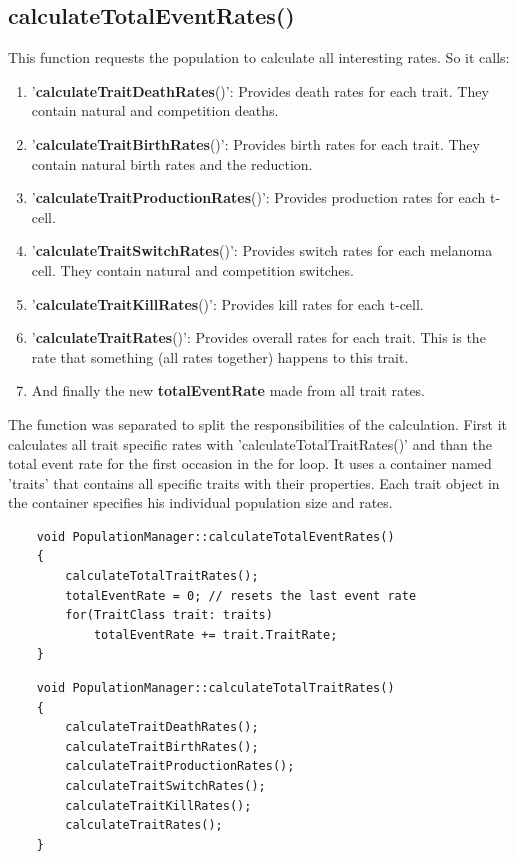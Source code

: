 \documentclass[a4paper,10pt]{scrartcl}
\begin{document}
	\subsection{calculateTotalEventRates()}\label{subsec:calcRates}
	This function requests the population to calculate all interesting rates. So it calls:
	\begin{enumerate}
		\item '\textbf{calculateTraitDeathRates}()': Provides death rates for each trait. They contain natural and competition deaths.
		\item '\textbf{calculateTraitBirthRates}()': Provides birth rates for each trait. They contain natural birth rates and the reduction.
		\item '\textbf{calculateTraitProductionRates}()': Provides production rates for each t-cell. 
		\item '\textbf{calculateTraitSwitchRates}()': Provides switch rates for each melanoma cell. They contain natural and competition switches.
		\item '\textbf{calculateTraitKillRates}()': Provides kill rates for each t-cell. 
		\item '\textbf{calculateTraitRates}()': Provides overall rates for each trait. This is the rate that something (all rates together) happens to this trait.
		\item And finally the new \textbf{totalEventRate} made from all trait rates. \\
	\end{enumerate}	
	The function was separated to split the responsibilities of the calculation. First it calculates all trait specific rates with 'calculateTotalTraitRates()' and than the total event rate for the first occasion in the for loop. It uses a container named 'traits' that contains all specific traits with their properties. Each trait object in the container specifies his individual population size and rates.
	\begin{lstlisting} 
	void PopulationManager::calculateTotalEventRates()
	{
	    calculateTotalTraitRates();
	    totalEventRate = 0; // resets the last event rate
	    for(TraitClass trait: traits)
	        totalEventRate += trait.TraitRate;
	}
	\end{lstlisting}
	\begin{lstlisting} 
	void PopulationManager::calculateTotalTraitRates()
	{
	    calculateTraitDeathRates();
	    calculateTraitBirthRates();
	    calculateTraitProductionRates();
	    calculateTraitSwitchRates();
	    calculateTraitKillRates();
	    calculateTraitRates();
	}
	\end{lstlisting}	
		
\end{document}
